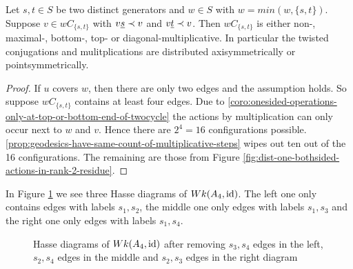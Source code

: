 \begin{lemm}
	Let $s,t \in S$ be two distinct generators and $w \in S$ with $w = min(w,\{s,t\})$. Suppose $v \in wC_{\{s,t\}}$ with $v \underline{s} \prec v$ and $v \underline{t} \prec v$. Then $wC_{\{s,t\}}$ is either non-, maximal-, bottom-, top- or diagonal-multiplicative. In particular the twisted conjugations and mulitplications are distributed axisymmetrically or pointsymmetrically.

	\begin{proof}
		If $u$ covers $w$, then there are only two edges and the assumption holds. So suppose $wC_{\{s,t\}}$ contains at least four edges. Due to \ref{coro:onesided-operations-only-at-top-or-bottom-end-of-twocycle} the actions by multiplication can only occur next to $w$ and $v$. Hence there are $2^4 = 16$ configurations possible. \ref{prop:geodesics-have-same-count-of-multiplicative-steps} wipes out ten out of the 16 configurations. The remaining are those from Figure \ref{fig:dist-one-bothsided-actions-in-rank-2-residue}.
	\end{proof}
\end{lemm}

\begin{exam}
	In Figure \ref{fig:a4_s1s3-and-a4_s2s4} we see three Hasse diagrams of $Wk(A_4, \operatorname{id})$. The left one only contains edges with labels $s_1,s_2$, the middle one only edges with labels $s_1,s_3$ and the right one only edges with labels $s_1,s_4$.
	\begin{figure}[ht]
		\centering
		
		\quad \quad
		
		\quad \quad
		
		\caption{Hasse diagrams of $Wk(A_4, \operatorname{id})$ after removing $s_3,s_4$ edges in the left, $s_2,s_4$ edges in the middle and $s_2,s_3$ edges in the right diagram}
		\label{fig:a4_s1s3-and-a4_s2s4}
	\end{figure}
\end{exam}

